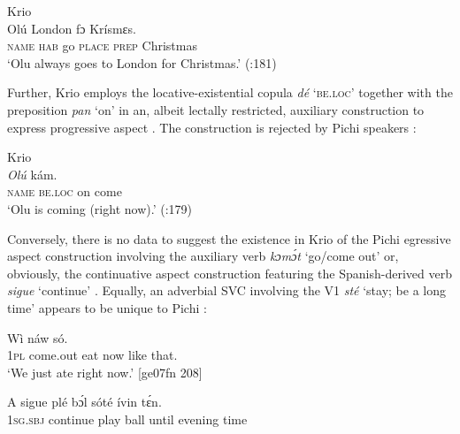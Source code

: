 \ea%
    \label{ex:key:12}
{{Krio}}{}{}\\
    \gll   Olú        London  fɔ  Krísmɛs.\\
\textsc{name}  \textsc{hab}    go  \textsc{place}  \textsc{prep}  Christmas\\

\glt ‘Olu always goes to London for Christmas.’  (\citealt{YillahCorcoran2007}:181)
\z

Further, Krio employs the locative-existential copula \textit{dé} \textsc{‘be.loc’} together with the preposition \textit{pan} ‘on’ in an, albeit lectally restricted, auxiliary construction to express progressive aspect . The construction is rejected by Pichi speakers :


\ea%
    \label{ex:key:13}
{{Krio}}{}{}\\
    \gll   \textit{\textup{Olú}}           kám.\\
\textsc{name}  \textsc{be.loc}  on    come\\

\glt ‘Olu is coming (right now).’ (\citealt{YillahCorcoran2007}:179)
\z


\z

Conversely, there is no data to suggest the existence in Krio of the Pichi egressive aspect construction involving the auxiliary verb \textit{kɔmɔ́t} ‘go/come out’  or, obviously, the continuative aspect construction featuring the Spanish-derived verb \textit{sigue} ‘continue’ . Equally, an adverbial SVC involving the V1 \textit{sté} ‘stay; be a long time’ appears to be unique to Pichi : 


\ea%
    \label{ex:key:15}
    \gll   Wì        náw    só.\\
 \textsc{1pl}  come.out  eat    now    like that.\\
\glt ‘We just ate right now.’ [ge07fn 208]
\z


\ea%
    \label{ex:key:16}
    \gll   A    sigue    plé    bɔ́l  sóté    ívin    tɛ́n.\\
\textsc{1sg.sbj}  continue    play    ball  until  evening  time\\

